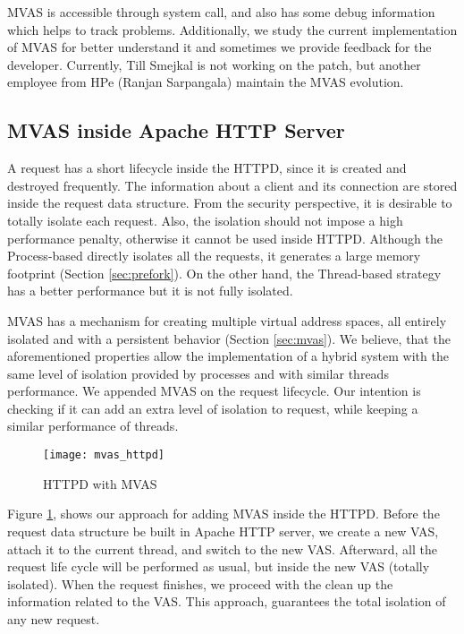 MVAS is accessible through system call, and also has some debug information
which helps to track problems. Additionally, we study the current
implementation of MVAS for better understand it and sometimes we provide
feedback for the developer. Currently, Till Smejkal is not working on the
patch, but another employee from HPe (Ranjan Sarpangala) maintain the MVAS
evolution.

\subsection{MVAS inside Apache HTTP Server}

A request has a short lifecycle inside the HTTPD, since it is created and
destroyed frequently. The information about a client and its connection are
stored inside the request data structure. From the security perspective, it is
desirable to totally isolate each request. Also, the isolation should not
impose a high performance penalty, otherwise it cannot be used inside HTTPD.
Although the Process-based directly isolates all the requests, it generates a
large memory footprint (Section \ref{sec:prefork}). On the other hand, the
Thread-based strategy has a better performance but it is not fully isolated.

MVAS has a mechanism for creating multiple virtual address spaces, all entirely
isolated and with a persistent behavior (Section \ref{sec:mvas}). We believe,
that the aforementioned properties allow the implementation of a hybrid system
with the same level of isolation provided by processes and with similar threads
performance. We appended MVAS on the request lifecycle. Our intention is
checking if it can add an extra level of isolation to request, while keeping a
similar performance of threads.

\begin{figure}[!h]
  \centering
  \texttt{[image: mvas\_httpd]} 
  \caption{HTTPD with MVAS}
  \label{fig:httpd_mvas} 
\end{figure}

Figure \ref{fig:httpd_mvas}, shows our approach for adding MVAS inside the
HTTPD. Before the request data structure be built in Apache HTTP server, we
create a new VAS, attach it to the current thread, and switch to the new VAS.
Afterward, all the request life cycle will be performed as usual, but inside
the new VAS (totally isolated). When the request finishes, we proceed with the
clean up the information related to the VAS. This approach, guarantees the
total isolation of any new request.

